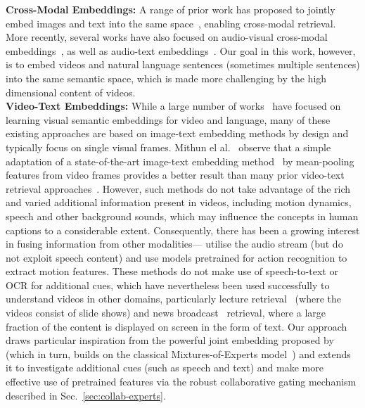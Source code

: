 \documentclass{bmvc2k}
\begin{document}
\noindent\textbf{Cross-Modal Embeddings:} A range of prior work has proposed to jointly embed images and text into the same space~\cite{farhadi2010every,frome2013devise,faghri2017vse,kiros2014unifying,nam2017dual}, enabling cross-modal retrieval. More recently, several works have also focused on audio-visual cross-modal embeddings~\cite{arandjelovic2017look,nagrani2018learnable}, as well as audio-text embeddings~\cite{chechik2008large}. Our goal in this work, however, is to embed videos and natural language sentences (sometimes multiple sentences) into the same semantic space, which is made more challenging by the high dimensional content of videos.  \\ 
\noindent\textbf{Video-Text Embeddings:} 
While a large number of
works~\cite{dong2016word2visualvec,otani2016learning,pan2016jointly,torabi2016learning,xu2015jointly}
have focused on learning visual semantic embeddings for video and
language, many of these existing approaches are based on image-text
embedding methods by design and typically focus on single visual frames. Mithun el al.~\cite{mithun2018learning}
observe that a simple adaptation of a state-of-the-art image-text
embedding method~\cite{faghri2017vse} by mean-pooling features from
video frames provides a better result than many prior video-text
retrieval approaches~\cite{dong2016word2visualvec,otani2016learning}.
However, such methods do not take advantage of the rich and varied
additional information present in videos, including motion
dynamics, speech and other background sounds, which may influence the
concepts in human captions to a considerable extent.  Consequently, there has been a
growing interest in fusing information from other modalities---\cite{mithun2018learning,miech2018learning} utilise the audio stream
(but do not exploit speech content) and use models pretrained for
action recognition to extract motion features. These methods do not make use of speech-to-text or OCR for additional cues, which have nevertheless been used successfully to understand videos in other domains, particularly lecture retrieval~\cite{radha2016video,yamamoto2003topic} (where the videos consist of slide shows) and news broadcast~\cite{hauptmann2002multi} retrieval, where a large fraction of the content is displayed on screen in the form of text.   Our approach draws particular inspiration from the powerful joint embedding proposed by~\cite{miech2018learning} (which in turn, builds on the classical Mixtures-of-Experts model~\cite{jordan1994hierarchical}) and extends it to investigate additional cues (such as speech and text) and make more effective use of pretrained features via the robust collaborative gating mechanism described in Sec.~\ref{sec:collab-experts}.\\
\end{document}
